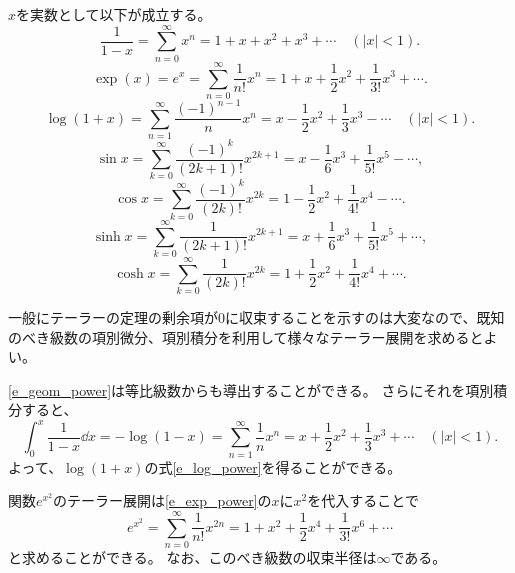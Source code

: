 \begin{proposition}[種々の関数のテーラー展開]
$x$を実数として以下が成立する。
\begin{equation}
\label{e_geom_power}
\frac{1}{1-x} = \sum_{n = 0}^\infty x^n = 1+x+x^2+x^3+\cdots \quad (|x| < 1).
\end{equation}
\begin{equation}
\label{e_exp_power}
\exp(x) = e^x = \sum_{n = 0}^\infty \frac{1}{n!}x^n = 1+x+\frac{1}{2}x^2+\frac{1}{3!}x^3+\cdots.
\end{equation}
\begin{equation}
\label{e_log_power}
\log(1+x) = \sum_{n = 1}^\infty \frac{(-1)^{n-1}}{n}x^n = x-\frac{1}{2}x^2+\frac{1}{3}x^3-\cdots \quad (|x| < 1).
\end{equation}
$$
\sin x = \sum_{k = 0}^\infty \frac{(-1)^k}{(2 k+1)!}x^{2 k+1} = x-\frac{1}{6}x^3+\frac{1}{5!}x^5-\cdots,
$$
$$
\cos x = \sum_{k = 0}^\infty \frac{(-1)^k}{(2 k)!}x^{2 k} = 1-\frac{1}{2}x^2+\frac{1}{4!}x^4-\cdots.
$$
$$
\sinh x = \sum_{k = 0}^\infty \frac{1}{(2 k+1)!}x^{2 k+1} = x+\frac{1}{6}x^3+\frac{1}{5!}x^5+\cdots,
$$
$$
\cosh x = \sum_{k = 0}^\infty \frac{1}{(2 k)!}x^{2 k} = 1+\frac{1}{2}x^2+\frac{1}{4!}x^4+\cdots.
$$
\end{proposition}

一般にテーラーの定理の剰余項が$0$に収束することを示すのは大変なので、既知のべき級数の項別微分、項別積分を利用して様々なテーラー展開を求めるとよい。

\begin{remark}
\eqref{e_geom_power}は等比級数からも導出することができる。
さらにそれを項別積分すると、
$$
\int_0^x \frac{1}{1-x}\dd{x} = -\log(1-x) = \sum_{n = 1}^\infty \frac{1}{n}x^n = x+\frac{1}{2}x^2+\frac{1}{3}x^3+\cdots \quad (|x| < 1).
$$
よって、$\log(1+x)$の式\eqref{e_log_power}を得ることができる。
\end{remark}

\begin{example}
関数$e^{x^2}$のテーラー展開は\eqref{e_exp_power}の$x$に$x^2$を代入することで
$$
e^{x^2} = \sum_{n = 0}^\infty \frac{1}{n!}x^{2 n} = 1+x^2+\frac{1}{2}x^4+\frac{1}{3!}x^6+\cdots
$$
と求めることができる。
なお、このべき級数の収束半径は$\infty$である。
\end{example}
